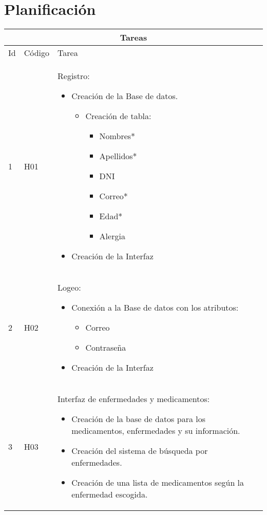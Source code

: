 \chapter{Planificación}

\begin{table}[htb]
\centering
\begin{tabular}{|l|p{1.5cm}|p{10cm}|}
	\hline
	\multicolumn{3}{|c|}{Tareas} \\ \hline
	Id & Código & Tarea \\
	\hline \hline
	1 & H01  & Registro:\begin{itemize}
		\item Creación de la Base de datos.
			\begin{itemize}
			\item Creación de tabla:
			 		\begin{itemize}
			 		\item Nombres*
			 		\item Apellidos*
			 		\item DNI
			 		\item Correo*
			 		\item Edad*
			 		\item Alergia		 	 
			 	\end{itemize}
			\end{itemize}
		\item Creación de la Interfaz
		
		
	\end{itemize}\\ \hline
	
	2 & H02  & Logeo: \begin{itemize}
		\item Conexión a la Base de datos con los atributos:							
			\begin{itemize}						
				\item Correo
				\item Contraseña	 	 				
			\end{itemize}
		
		\item Creación de la Interfaz
		\end{itemize}\\ \hline
	
	3 & H03 & Interfaz de enfermedades y medicamentos: 

	 \begin{itemize}
		\item Creación de la base de datos para los medicamentos, enfermedades y su información.
		\item Creación del sistema de búsqueda por enfermedades.
		\item Creación de una lista de medicamentos según la enfermedad escogida.
	

\end{itemize}
\end{tabular}
\end{table}
